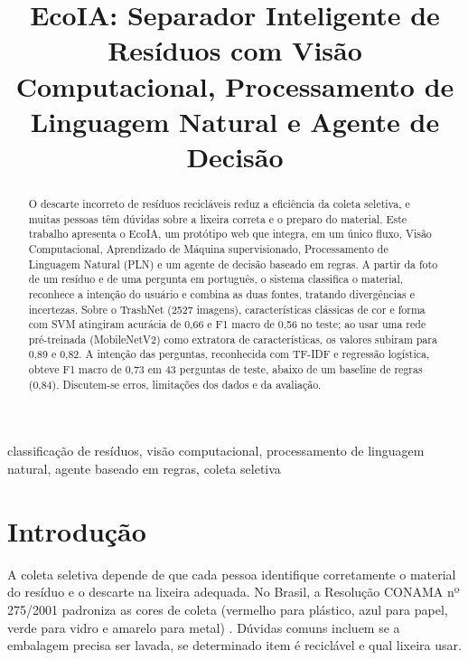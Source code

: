 \documentclass[conference]{IEEEtran}
\begin{document}
\title{EcoIA: Separador Inteligente de Resíduos com Visão Computacional, Processamento de Linguagem Natural e Agente de Decisão}

\author{
}

\maketitle

\begin{abstract}
O descarte incorreto de resíduos recicláveis reduz a eficiência da coleta seletiva, e muitas pessoas têm dúvidas sobre a lixeira correta e o preparo do material. Este trabalho apresenta o EcoIA, um protótipo web que integra, em um único fluxo, Visão Computacional, Aprendizado de Máquina supervisionado, Processamento de Linguagem Natural (PLN) e um agente de decisão baseado em regras. A partir da foto de um resíduo e de uma pergunta em português, o sistema classifica o material, reconhece a intenção do usuário e combina as duas fontes, tratando divergências e incertezas. Sobre o TrashNet (2527 imagens), características clássicas de cor e forma com SVM atingiram acurácia de 0,66 e F1 macro de 0,56 no teste; ao usar uma rede pré-treinada (MobileNetV2) como extratora de características, os valores subiram para 0,89 e 0,82. A intenção das perguntas, reconhecida com TF-IDF e regressão logística, obteve F1 macro de 0,73 em 43 perguntas de teste, abaixo de um baseline de regras (0,84). Discutem-se erros, limitações dos dados e da avaliação.
\end{abstract}

\begin{IEEEkeywords}
classificação de resíduos, visão computacional, processamento de linguagem natural, agente baseado em regras, coleta seletiva
\end{IEEEkeywords}

\section{Introdução}
A coleta seletiva depende de que cada pessoa identifique corretamente o material do resíduo e o descarte na lixeira adequada. No Brasil, a Resolução CONAMA nº 275/2001 padroniza as cores de coleta (vermelho para plástico, azul para papel, verde para vidro e amarelo para metal) \cite{conama}. Dúvidas comuns incluem se a embalagem precisa ser lavada, se determinado item é reciclável e qual lixeira usar.
\end{document}

